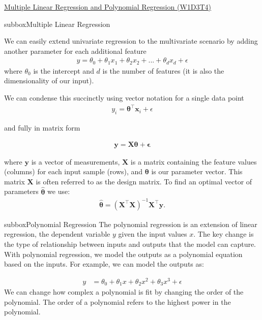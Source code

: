 \begin{textbox}{\href{https://compneuro.neuromatch.io/tutorials/W1D3_ModelFitting/student/W1D3_Tutorial4.html}{Multiple Linear Regression and Polynomial Regression (W1D3T4)}   }
\begin{subbox}{subbox}{Multiple Linear Regression}
\scriptsize

We can easily extend univariate regression to the multivariate scenario by adding another parameter for each additional feature
\begin{align}
y = \theta_0 + \theta_1 x_1 + \theta_2 x_2 + ... +\theta_d x_d + \epsilon
\end{align}
where $\theta_0$ is the intercept and $d$ is the number of features (it is also the dimensionality of our input).

We can condense this succinctly using vector notation for a single data point
\begin{align}
y_i = \boldsymbol{\theta}^{\top}\mathbf{x}_i + \epsilon
\end{align}

and fully in matrix form

\begin{align}
\mathbf{y} = \mathbf{X}\boldsymbol{\theta} + \mathbf{\epsilon}
\end{align}

where $\mathbf{y}$ is a vector of measurements, $\mathbf{X}$ is a matrix containing the feature values (columns) for each input sample (rows), and $\boldsymbol{\theta}$ is our parameter vector.
This matrix $\mathbf{X}$ is often referred to as the design matrix.
To find an optimal vector of parameters $\boldsymbol{\hat\theta}$ we use:
\begin{align}
\boldsymbol{\hat\theta} = (\mathbf{X}^\top\mathbf{X})^{-1}\mathbf{X}^\top\mathbf{y}.
\end{align}
\end{subbox}
\begin{subbox}{subbox}{Polynomial Regression}
\scriptsize
The polynomial regression is an extension of linear regression, the dependent variable $y$ given the input values $x$. The key change is the type of relationship between inputs and outputs that the model can capture.
With polynomial regression, we model the outputs as a polynomial equation based on the inputs. For example, we can model the outputs as:

\begin{align}
y & = \theta_0 + \theta_1 x + \theta_2 x^2 + \theta_3 x^3 + \epsilon
\end{align}
We can change how complex a polynomial is fit by changing the order of the polynomial. The order of a polynomial refers to the highest power in the polynomial. 


\end{subbox}
\end{textbox}
